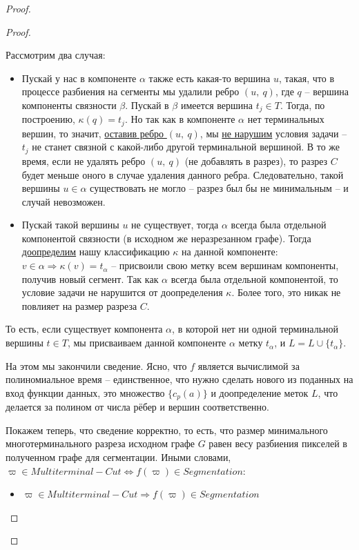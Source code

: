 \documentclass[a4paper,12pt]{article}
\begin{document}
\begin{proof}
\begin{proof}
\begin{center}
\begin{tikzpicture}
        \end{tikzpicture}
        \end{center}
        Рассмотрим два случая:
        \begin{itemize}
            \item Пускай у нас в компоненте $\alpha$ также есть какая-то вершина $u$, такая, что в процессе разбиения на сегменты мы удалили ребро $(u,\ q)$, где $q$ -- вершина компоненты связности $\beta$. Пускай в $\beta$ имеется вершина $t_j \in T$. Тогда, по построению, $\kappa(q) = t_j$. Но так как в компоненте $\alpha$ нет терминальных вершин, то значит, \underline{оставив ребро $(u,\ q)$}, мы \underline{не нарушим} условия задачи -- $t_j$ не станет связной с какой-либо другой терминальной вершиной. В то же время, если не удалять ребро $(u,\ q)$ (не добавлять в разрез), то разрез $C$ будет меньше оного в случае удаления данного ребра. Следовательно, такой вершины $u \in \alpha$ существовать не могло -- разрез был бы не минимальным -- и случай невозможен.
            \item Пускай такой вершины $u$ не существует, тогда $\alpha$ всегда была отдельной компонентой связности (в исходном же неразрезанном графе). Тогда \underline{доопределим} нашу классификацию $\kappa$  на данной компоненте: $v \in \alpha \Rightarrow \kappa(v) = t_{\alpha}$ -- присвоили свою метку всем вершинам компоненты, получив новый сегмент. Так как $\alpha$ всегда была отдельной компонентой, то условие задачи не нарушится от доопределения $\kappa$. Более того, это никак не повлияет на размер разреза $C$.
            \end{itemize}
        То есть, если существует компонента $\alpha$, в которой нет ни одной терминальной вершины $t \in T$, мы присваиваем данной компоненте $\alpha$ метку $t_{\alpha}$, и $L = L \cup \{t_{\alpha}\}$.
        
        На этом мы закончили сведение. Ясно, что $f$ является вычислимой за полиномиальное время -- единственное, что нужно сделать нового из поданных на вход функции данных, это множество $\{c_p(a)\}$ и доопределение меток $L$, что делается за полином от числа рёбер и вершин соответственно.
        
        Покажем теперь, что сведение корректно, то есть, что размер минимального многотерминального разреза исходном графе $G$ равен весу разбиения пикселей в полученном графе для сегментации. Иными словами, $\varpi \in Multiterminal-Cut \Longleftrightarrow f(\varpi) \in Segmentation$:
        \begin{itemize}
            \item $\varpi \in Multiterminal-Cut \Longrightarrow f(\varpi) \in Segmentation$
            

\end{itemize}
\end{proof}
\end{proof}
\end{document}
